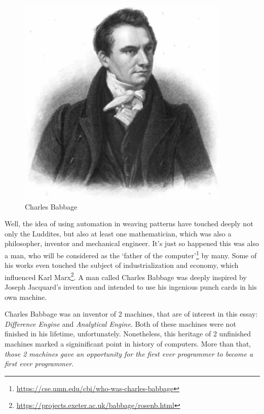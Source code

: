 \documentclass{article}
\begin{document}
            \begin{figure}
                \centering
                \includegraphics[scale=0.2]{images/persons/person_charles_babbage.png}
                \caption{Charles Babbage}
            \end{figure}

            Well, the idea of using automation in weaving patterns have touched deeply not only the Luddites, but also at least one mathematician, which was also a philosopher,
            inventor and mechanical engineer. It's just so happened this was also a man, who will be considered as the `father of the computer'\footnote{\href{https://cse.umn.edu/cbi/who-was-charles-babbage}
            {https://cse.umn.edu/cbi/who-was-charles-babbage}} by many. Some of his works even touched the subject of industrialization and economy, which influenced Karl 
            Marx\footnote{\href{https://projects.exeter.ac.uk/babbage/rosenb.html}{https://projects.exeter.ac.uk/babbage/rosenb.html}}. A man called Charles Babbage was deeply
            inspired by Joseph Jacquard's invention and intended to use his ingenious punch cards in his own machine. \par

            Charles Babbage was an inventor of 2 machines, that are of interest in this essay: \emph{Difference Engine} and \emph{Analytical Engine}. Both of these machines
            were not finished in his lifetime, unfortunately. Nonetheless, this heritage of 2 unfinished machines marked a signinificant point in history of computers. More 
            than that, \emph{those 2 machines gave an opportunity for the first ever programmer to become a first ever programmer}. \par
            
\end{document}
